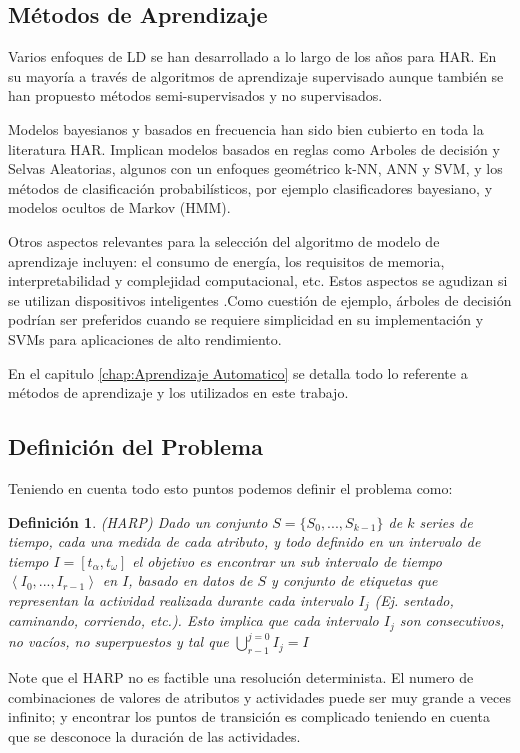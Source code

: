 \subsection{Métodos de Aprendizaje}
Varios enfoques de LD se han desarrollado a lo largo de los años para HAR. En su mayoría a través de algoritmos de aprendizaje supervisado aunque también se han propuesto métodos semi-supervisados y no supervisados.

Modelos bayesianos y basados en frecuencia han sido bien cubierto en toda la literatura HAR. Implican modelos basados en reglas como Arboles de decisión y Selvas Aleatorias, algunos con un enfoques geométrico k-NN, ANN y SVM, y los métodos de clasificación probabilísticos, por ejemplo clasificadores bayesiano, y modelos ocultos de Markov (HMM).

Otros aspectos relevantes para la selección del algoritmo de modelo de aprendizaje incluyen: el consumo de energía, los requisitos de memoria, interpretabilidad y complejidad computacional, etc. Estos aspectos se agudizan si se utilizan dispositivos inteligentes .Como cuestión de ejemplo, árboles de decisión podrían ser preferidos cuando se requiere simplicidad en su implementación y SVMs para aplicaciones de alto rendimiento.

En el capitulo \ref{chap:Aprendizaje Automatico} se detalla todo lo referente a métodos de aprendizaje y los utilizados en este trabajo.

\subsection{Definición del Problema}
Teniendo en cuenta todo esto puntos podemos definir el problema como:

\newtheorem{defi}{Definición}

\begin{defi}(HARP)
	Dado un conjunto $S = \{S_{0},...,S_{k-1}\} $ de $k$ series de tiempo, cada una medida de cada atributo, y todo definido en un intervalo de tiempo $I =  \left [ t_{\alpha}, t_{\omega} \right ]$ el objetivo es encontrar un sub intervalo de tiempo $\left\langle I_{0},...,I_{r-1} \right\rangle $ en $I$, basado en datos de $S$ y conjunto de etiquetas que representan la actividad realizada durante cada intervalo $I_{j}$ (Ej. sentado, caminando, corriendo, etc.). Esto implica que cada intervalo $I_{j}$ son consecutivos, no vacíos, no superpuestos y tal que $ \displaystyle\bigcup_{r-1}^{j=0}{I_j = I } $
\end{defi}

Note que el HARP no es factible una resolución determinista. El numero de combinaciones de valores de atributos y actividades puede ser muy grande a veces infinito; y encontrar los puntos de transición es complicado teniendo en cuenta que se desconoce la duración de las actividades.

